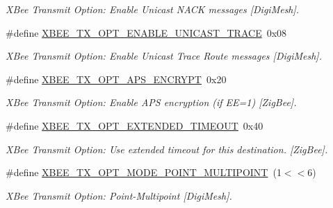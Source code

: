 \begin{DoxyCompactItemize}
\begin{DoxyCompactList}\small\item\em X\+Bee Transmit Option\+: Enable Unicast N\+A\+CK messages \mbox{[}Digi\+Mesh\mbox{]}. \end{DoxyCompactList}\item 
\mbox{\label{group__xbee__wpan_ga44452074ba3205f9860d4d16e339aba1}} 
\#define \hyperlink{group__xbee__wpan_ga44452074ba3205f9860d4d16e339aba1}{X\+B\+E\+E\+\_\+\+T\+X\+\_\+\+O\+P\+T\+\_\+\+E\+N\+A\+B\+L\+E\+\_\+\+U\+N\+I\+C\+A\+S\+T\+\_\+\+T\+R\+A\+CE}~0x08
\begin{DoxyCompactList}\small\item\em X\+Bee Transmit Option\+: Enable Unicast Trace Route messages \mbox{[}Digi\+Mesh\mbox{]}. \end{DoxyCompactList}\item 
\mbox{\label{group__xbee__wpan_ga0a9bf2b58851b7d8db5359aefef3cfe0}} 
\#define \hyperlink{group__xbee__wpan_ga0a9bf2b58851b7d8db5359aefef3cfe0}{X\+B\+E\+E\+\_\+\+T\+X\+\_\+\+O\+P\+T\+\_\+\+A\+P\+S\+\_\+\+E\+N\+C\+R\+Y\+PT}~0x20
\begin{DoxyCompactList}\small\item\em X\+Bee Transmit Option\+: Enable A\+PS encryption (if EE=1) \mbox{[}Zig\+Bee\mbox{]}. \end{DoxyCompactList}\item 
\mbox{\label{group__xbee__wpan_ga60a1c57a93cd57570fb73bae97535fcb}} 
\#define \hyperlink{group__xbee__wpan_ga60a1c57a93cd57570fb73bae97535fcb}{X\+B\+E\+E\+\_\+\+T\+X\+\_\+\+O\+P\+T\+\_\+\+E\+X\+T\+E\+N\+D\+E\+D\+\_\+\+T\+I\+M\+E\+O\+UT}~0x40
\begin{DoxyCompactList}\small\item\em X\+Bee Transmit Option\+: Use extended timeout for this destination. \mbox{[}Zig\+Bee\mbox{]}. \end{DoxyCompactList}\item 
\mbox{\label{group__xbee__wpan_gab96b311d46a70649710385c64dde72f2}} 
\#define \hyperlink{group__xbee__wpan_gab96b311d46a70649710385c64dde72f2}{X\+B\+E\+E\+\_\+\+T\+X\+\_\+\+O\+P\+T\+\_\+\+M\+O\+D\+E\+\_\+\+P\+O\+I\+N\+T\+\_\+\+M\+U\+L\+T\+I\+P\+O\+I\+NT}~(1$<$$<$6)
\begin{DoxyCompactList}\small\item\em X\+Bee Transmit Option\+: Point-\/\+Multipoint \mbox{[}Digi\+Mesh\mbox{]}. \end{DoxyCompactList}\item 
$$
\end{DoxyCompactItemize}
